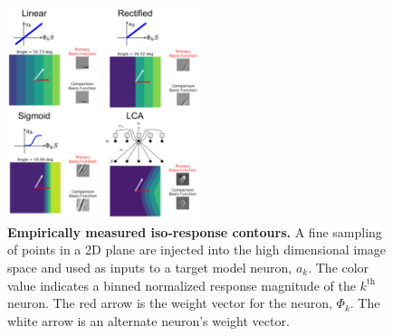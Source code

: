 \begin{figure}[h]
    \centering
    \includegraphics[width=0.5\textwidth]{figures/iso_contour_comparison.png}
    \caption{\textbf{Empirically measured iso-response contours.} A fine sampling of points in a 2D plane are injected into the high dimensional image space and used as inputs to a target model neuron, $a_{k}$. The color value indicates a binned normalized response magnitude of the $k^{\text{th}}$ neuron. The red arrow is the weight vector for the neuron, $\Phi_{k}$. The white arrow is an alternate neuron's weight vector.}
    \label{fig:ch4_iso_contours}
\end{figure}

